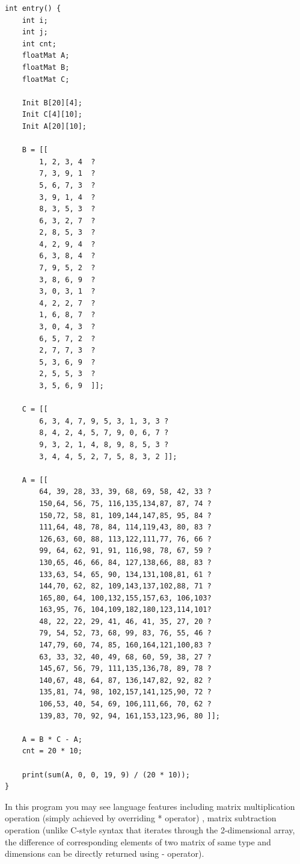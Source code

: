 \documentclass[12pt]{article} %
\begin{document}
\begin{lstlisting}[firstline=1,lastline=30]
int entry() {
    int i;
    int j;
    int cnt;
    floatMat A;
    floatMat B;
    floatMat C;

    Init B[20][4];
    Init C[4][10];
    Init A[20][10];

    B = [[
        1, 2, 3, 4  ?
        7, 3, 9, 1  ?
        5, 6, 7, 3  ?
        3, 9, 1, 4  ?
        8, 3, 5, 3  ?
        6, 3, 2, 7  ?
        2, 8, 5, 3  ?
        4, 2, 9, 4  ?
        6, 3, 8, 4  ?
        7, 9, 5, 2  ?
        3, 8, 6, 9  ?
        3, 0, 3, 1  ?
        4, 2, 2, 7  ?
        1, 6, 8, 7  ?
        3, 0, 4, 3  ?
        6, 5, 7, 2  ?
        2, 7, 7, 3  ?
        5, 3, 6, 9  ?
        2, 5, 5, 3  ?
        3, 5, 6, 9  ]];

    C = [[
        6, 3, 4, 7, 9, 5, 3, 1, 3, 3 ?
        8, 4, 2, 4, 5, 7, 9, 0, 6, 7 ?
        9, 3, 2, 1, 4, 8, 9, 8, 5, 3 ?
        3, 4, 4, 5, 2, 7, 5, 8, 3, 2 ]];

    A = [[
        64, 39, 28, 33, 39, 68, 69, 58, 42, 33 ?
        150,64, 56, 75, 116,135,134,87, 87, 74 ?
        150,72, 58, 81, 109,144,147,85, 95, 84 ?
        111,64, 48, 78, 84, 114,119,43, 80, 83 ?
        126,63, 60, 88, 113,122,111,77, 76, 66 ?
        99, 64, 62, 91, 91, 116,98, 78, 67, 59 ?
        130,65, 46, 66, 84, 127,138,66, 88, 83 ?
        133,63, 54, 65, 90, 134,131,108,81, 61 ?
        144,70, 62, 82, 109,143,137,102,88, 71 ?
        165,80, 64, 100,132,155,157,63, 106,103?
        163,95, 76, 104,109,182,180,123,114,101?
        48, 22, 22, 29, 41, 46, 41, 35, 27, 20 ?
        79, 54, 52, 73, 68, 99, 83, 76, 55, 46 ?
        147,79, 60, 74, 85, 160,164,121,100,83 ?
        63, 33, 32, 40, 49, 68, 60, 59, 38, 27 ?
        145,67, 56, 79, 111,135,136,78, 89, 78 ?
        140,67, 48, 64, 87, 136,147,82, 92, 82 ?
        135,81, 74, 98, 102,157,141,125,90, 72 ?
        106,53, 40, 54, 69, 106,111,66, 70, 62 ?
        139,83, 70, 92, 94, 161,153,123,96, 80 ]];

    A = B * C - A;
    cnt = 20 * 10;
    
    print(sum(A, 0, 0, 19, 9) / (20 * 10));
}
\end{lstlisting}

In this program you may see language features including matrix multiplication operation (simply achieved by overriding * operator) , matrix subtraction operation (unlike C-style syntax that iterates through the 2-dimensional array, the difference of corresponding elements of two matrix of same type and dimensions can be directly returned using - operator).
\end{document}
